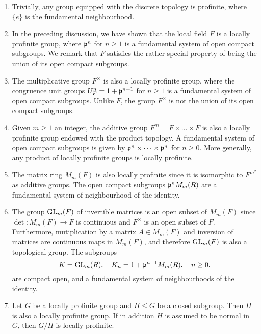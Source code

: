 \begin{examples} \label{example_prof_groups}

    \begin{enumerate}[(1)]
        \item Trivially, any group equipped with the discrete topology is profinite, where $\{e\}$ is the fundamental neighbourhood.
        \item In the preceding discussion, we have shown that the local field $F$ is a locally profinite group, where $\mathfrak{p}^n$ for $n\geq1$ is a fundamental system of open compact subgroups. We remark that $F$ satisfies the rather special property of being the union of its open compact subgroups. %
        \item The multiplicative group $F^{\times}$ is also a locally profinite group, where the congruence unit groups $U_F^n=1+\mathfrak{p}^{n+1}$ for $n\geq1$ is a fundamental system of open compact subgroups. Unlike $F$, the group $F^{\times}$ is not the union of its open compact subgroups.
        \item Given $m\geq1$ an integer, the additive group $F^m=F\times\dots\times F$ is also a locally profinite group endowed with the product topology. A fundamental system of open compact subgroups is given by $\mathfrak{p}^{n}\times\dots\times\mathfrak{p}^{n}$ for $n\geq0$. More generally, any product of locally profinite groups is locally profinite.
        \item The matrix ring $M_m(F)$ is also locally profinite since it is isomorphic to $F^{m^2}$ as additive groups. The open compact subgroups $\mathfrak{p}^n M_m(R)$ are a fundamental system of neighbourhood of the identity.
        \item The group $\mathrm{GL}_m(F)$ of invertible matrices is an open subset of $M_m(F)$ since $\det:M_m(F)\rightarrow F$ is continuous and $F^{\times}$ is an open subset of $F$. Furthermore, mutiplication by a matrix $A\in M_m(F)$ and inversion of matrices are continuous maps in $M_m(F)$, and therefore $\mathrm{GL}_m(F)$ is also a topological group. The subgroups
        $$K=\mathrm{GL}_m(R),\quad K_n=1+\mathfrak{p}^{n+1}M_m(R),\quad n\geq 0,$$
        are compact open, and a fundamental system of neighbourhoods of the identity.
        \item Let $G$ be a locally profinite group and $H\leq G$ be a closed subgroup. Then $H$ is also a locally profinite group. If in addition $H$ is assumed to be normal in $G$, then $G/H$ is locally profinite. 
        
    \end{enumerate}
\end{examples}

